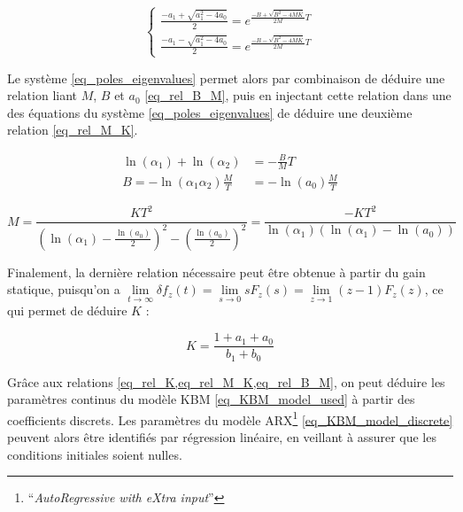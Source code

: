 \begin{equation} \label{eq_poles_eigenvalues}
	\begin{cases}
		\frac{-a_1 + \sqrt{a_1^2-4a_0}}{2} = e^{\frac{-B + \sqrt{B^2-4MK}}{2M}T}\\
		\frac{-a_1 - \sqrt{a_1^2-4a_0}}{2} = e^{\frac{-B - \sqrt{B^2-4MK}}{2M}T}
	\end{cases}
\end{equation}

Le système \cref{eq_poles_eigenvalues} permet alors par combinaison de déduire une relation liant $M$, $B$ et $a_0$ \cref{eq_rel_B_M}, puis en injectant cette relation dans une des équations du système \cref{eq_poles_eigenvalues} de déduire une deuxième relation \cref{eq_rel_M_K}.

\begin{equation} \label{eq_rel_B_M}
	\begin{split}
		\ln(\alpha_1) + \ln(\alpha_2) &= -\frac{B}{M}T\\
		B = -\ln(\alpha_1\alpha_2)\frac{M}{T} &= -\ln(a_0)\frac{M}{T}
	\end{split}
\end{equation}

\begin{equation} \label{eq_rel_M_K}
	M = \frac{KT^2}{\left(\ln(\alpha_1) - \frac{\ln(a_0)}{2}\right)^2-\left(\frac{\ln(a_0)}{2}\right)^2} = \frac{-KT^2}{\ln(\alpha_1)\left(\ln(\alpha_1) - \ln(a_0)\right)}
\end{equation}

Finalement, la dernière relation nécessaire peut être obtenue à partir du gain statique, puisqu'on a $\lim\limits_{t\to\infty} \delta f_z(t) = \lim\limits_{s\to0} sF_z(s) = \lim\limits_{z\to1} (z-1)F_z(z)$, ce qui permet de déduire $K$ :

\begin{equation} \label{eq_rel_K}
	K = \frac{1 + a_1 + a_0}{b_1 + b_0}
\end{equation}

Grâce aux relations \cref{eq_rel_K,eq_rel_M_K,eq_rel_B_M}, on peut déduire les paramètres continus du modèle KBM \cref{eq_KBM_model_used} à partir des coefficients discrets. %
Les paramètres du modèle ARX\footnote{\foreignquote{french}{\textit{AutoRegressive with eXtra input}}} \cref{eq_KBM_model_discrete} peuvent alors être identifiés par régression linéaire, en veillant à assurer que les conditions initiales soient nulles.

